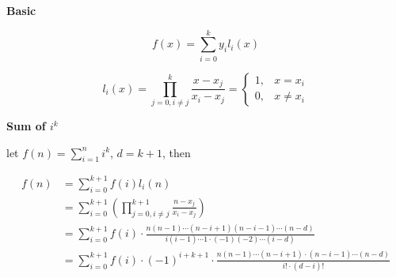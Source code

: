 \noindent\textbf{Basic}

\begin{equation}
f(x) = \sum_{i=0}^{k} y_il_i(x)
\end{equation}

\begin{equation*}
l_i(x)=\prod_{j=0,i \neq j}^{k} \frac{x - x_j}{x_i - x_j} = 
\left\{
\begin{array}{lr}
1, & x = x_i \\
0, & x \neq x_i
\end{array}
\right.
\end{equation*}

\noindent\textbf{Sum of $i^k$}

let $f(n) = \sum\limits_{i=1}^{n}i^k$, $d = k + 1$, then 

\begin{equation*}
\begin{aligned}
f(n) & = \sum\limits_{i=0}^{k+1} f(i)l_i(n) \\
& = \sum\limits_{i=0}^{k+1} \left( \prod\limits_{j=0, i \neq j}^{k+1} \frac{n-x_j}{x_i-x_j} \right) \\
& = \sum\limits_{i=0}^{k+1} f(i) \cdot \frac{n(n-1) \cdots (n-i+1)(n-i-1) \cdots (n-d)}{i(i-1) \cdots 1 \cdot (-1)(-2) \cdots (i-d)} \\
& = \sum\limits_{i=0}^{k+1} f(i) \cdot (-1)^{i+k+1} \cdot \frac{n(n-1) \cdots (n-i+1) \cdot (n-i-1) \cdots (n-d)}{i! \cdot (d-i)!}
\end{aligned}
\end{equation*}

